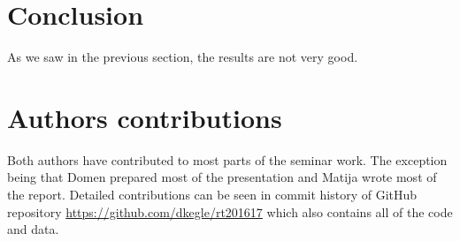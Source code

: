 \documentclass[12pt,a4paper]{amsart}
\begin{document}
\section{Conclusion}

As we saw in the previous section, the results are not very good.



\section{Authors contributions}
Both authors have contributed to most parts of the seminar work. The exception being that Domen prepared most of the presentation and Matija wrote most of the report. Detailed contributions can be seen in commit history of GitHub repository \url{https://github.com/dkegle/rt201617} which also contains all of the code and data.




\end{document}
